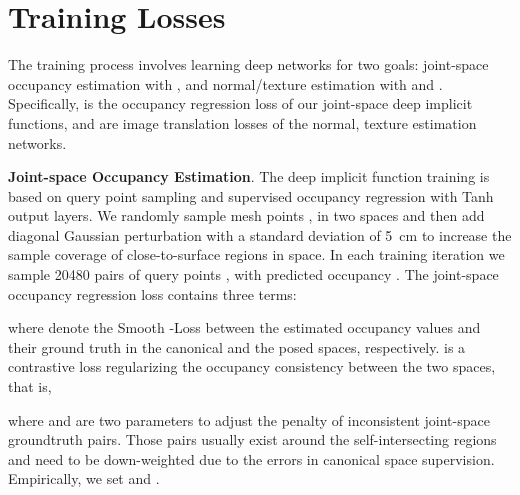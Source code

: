 \documentclass[10pt,twocolumn,letterpaper]{article}
\newcommand{\beforesection}{\vspace{-1.5mm}}
\newcommand{\aftersection}{\vspace{-1.5mm}}
\begin{document}
\beforesection
\vspace{-2pt}
\section{Training Losses} \label{sec:learning}
\aftersection

The training process involves learning deep networks for two goals: joint-space occupancy estimation with , and normal/texture estimation with  and .
Specifically,  is the occupancy regression loss of our joint-space deep implicit functions, and  are image translation losses of the normal, texture estimation networks. 

\textbf{Joint-space Occupancy Estimation}.
The deep implicit function training is based on query point sampling and supervised occupancy regression with Tanh output layers.
We randomly sample mesh points ,  in two spaces and then add diagonal Gaussian perturbation with a standard deviation of \SI{5}{cm} to increase the sample coverage of close-to-surface regions in space.
In each training iteration we sample 20480 pairs of query points , with predicted occupancy .
The joint-space occupancy regression loss contains three terms:

where  denote the Smooth -Loss between the estimated occupancy values and their ground truth in the canonical and the posed spaces, respectively.  is a contrastive loss regularizing the occupancy consistency between the two spaces, that is,

where  and  are two parameters to adjust the penalty of inconsistent joint-space groundtruth pairs. Those pairs usually exist around the self-intersecting regions and need to be down-weighted due to the errors in canonical space supervision. Empirically, we set  and .
\end{document}
